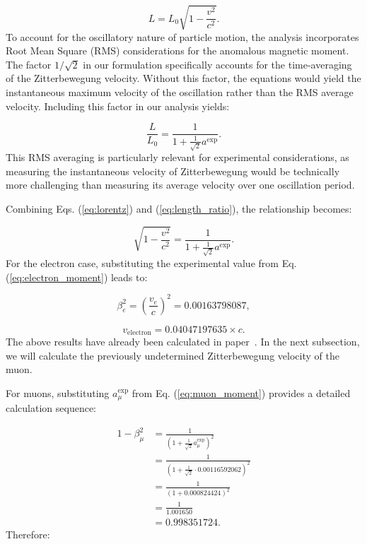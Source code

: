 \documentclass[%
 reprint,
 amsmath,amssymb,
 aps,
]{revtex4-1}
\numberwithin{equation}{section}%
\begin{document}
\begin{equation}
   L = L_0\sqrt{1 - \frac{v^2}{c^2}}.
   \label{eq:lorentz}
\end{equation}
To account for the oscillatory nature of particle motion, the analysis incorporates Root Mean Square (RMS) considerations for the anomalous magnetic moment. The factor $1/\sqrt{2}$ in our formulation specifically accounts for the time-averaging of the Zitterbewegung velocity. Without this factor, the equations would yield the instantaneous maximum velocity of the oscillation rather than the RMS average velocity. Including this factor in our analysis yields:

\begin{equation}
\frac{L}{L_0} = \frac{1}{1 + \frac{1}{\sqrt{2}}a^{\text{exp}}}.
\label{eq:length_ratio}
\end{equation}
This RMS averaging is particularly relevant for experimental considerations, as measuring the instantaneous velocity of Zitterbewegung would be technically more challenging than measuring its average velocity over one oscillation period.

Combining Eqs. (\ref{eq:lorentz}) and (\ref{eq:length_ratio}), the relationship becomes:

\begin{equation}
   \sqrt{1 - \frac{v^2}{c^2}} = \frac{1}{1 + \frac{1}{\sqrt{2}}a^{\text{exp}}}.
   \label{eq:combined}
\end{equation}
For the electron case, substituting the experimental value from Eq. (\ref{eq:electron_moment}) leads to:

\begin{equation}
   \beta^2_e = (\frac{v_e}{c})^2 = 0.00163798087,
   \label{eq:beta_electron}
\end{equation}

\begin{equation}
   v_{\text{electron}} = 0.04047197635 \times c.
   \label{eq:velocity_electron}
\end{equation}
The above results have already been calculated in paper~\cite{Hanamura2023}. In the next subsection, we will calculate the previously undetermined Zitterbewegung velocity of the muon.


For muons, substituting $a^{\text{exp}}_{\mu}$ from Eq. (\ref{eq:muon_moment}) provides a detailed calculation sequence:

\begin{equation}
   \begin{split}
       1 - \beta^2_{\mu} &= \frac{1}{(1 + \frac{1}{\sqrt{2}}a^{\text{exp}}_{\mu})^2} \\
       &= \frac{1}{(1 + \frac{1}{\sqrt{2}} \cdot 0.00116592062)^2} \\
       &= \frac{1}{(1 + 0.000824424)^2} \\
       &= \frac{1}{1.001650} \\
       &= 0.998351724.
   \label{eq:beta_muon_detailed}
   \end{split}
\end{equation}
Therefore:
\end{document}
